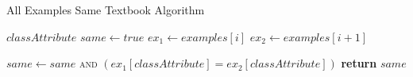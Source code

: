 \begin{algorithm}[H]
\caption{All Examples Same Textbook Algorithm}\label{a:id3-same-simple}
\begin{algorithmic}[1]
\renewcommand{\algorithmicrequire}{\textbf{Global Vars:}}
\Require $classAttribute$
    \State $same \gets true$
        \State $ex_1 \gets examples[i]$
        \State $ex_2 \gets examples[i+1]$

        \State $same \gets same$ \textsc{and} $(ex_1[classAttribute] = ex_2[classAttribute])$
    \EndFor
    \State \textbf{return} $same$
\EndProcedure
\end{algorithmic}
\end{algorithm}
